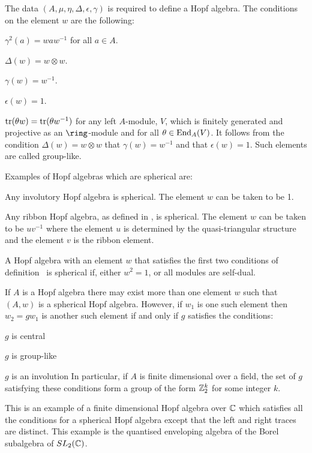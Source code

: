 The data $(A,\mu ,\eta ,\Delta ,\epsilon ,\gamma )$ is required to define a
Hopf algebra. The conditions on the element $w$ are the following:
\roster
\item $\gamma^2(a)=waw^{-1}$ for all $a\in A$.
\item $\Delta (w)=w\otimes w$.
\item $\gamma (w)=w^{-1}$.
\item $\epsilon(w)=1$.
\item $\operatorname{tr} (\theta w)=\operatorname{tr} (\theta w^{-1})$ for any left $A$-module, $V$, which is
finitely generated and projective as an $\ring$-module and for all $\theta\in\operatorname{End}_A(V)$.
\endroster
It follows from the condition $\Delta(w)=w\otimes w$ that $\gamma (w)=w^{-1}$
and that $\epsilon(w)=1$. Such elements are called group-like.

 Examples of Hopf algebras which are spherical are:
\roster
\item Any involutory Hopf algebra is spherical. The element $w$ can be taken
to be 1.
\item Any ribbon Hopf algebra, as defined in \cite{Reshetikhin and Turaev  1990},
is spherical. The element $w$ can be taken to be $uv^{-1}$ where the
element $u$ is determined by the quasi-triangular structure and the
element $v$ is the ribbon element.
\endroster\endexample

 A Hopf algebra with an element $w$ that satisfies
the first two conditions of definition \sphericalHopf\  is spherical if, 
either $w^2=1$, or all modules are self-dual.\endremark

 If $A$ is a Hopf algebra there may exist more
than one element $w$ such that $(A,w)$ is a spherical Hopf algebra.
However, if $w_1$ is one such element then $w_2=gw_1$ is another such
element if and only if $g$ satisfies the conditions:
\roster
\item $g$ is central
\item $g$ is group-like
\item $g$ is an involution
\endroster
In particular, if $A$ is finite dimensional over a field, the set of $g$ 
satisfying these conditions form a group of the form ${\Bbb Z}_2^k$ for some 
integer $k$.
\endremark

 This is an example of a finite dimensional
Hopf algebra over ${\Bbb C}$ which satisfies all the conditions for a spherical 
Hopf algebra except that the left and right traces are distinct. This 
example is the quantised enveloping algebra of the Borel subalgebra of 
$SL_2({\Bbb C})$.

